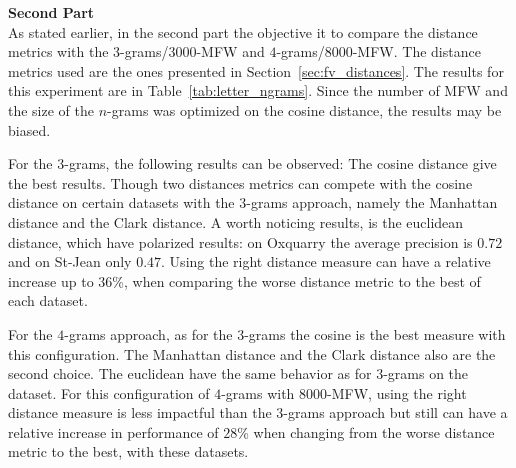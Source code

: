 \textbf{Second Part}\\
As stated earlier, in the second part the objective it to compare the distance metrics with the $3$-grams/$3000$-MFW and $4$-grams/$8000$-MFW.
The distance metrics used are the ones presented in Section~\ref{sec:fv_distances}.
The results for this experiment are in Table~\ref{tab:letter_ngrams}.
Since the number of MFW and the size of the $n$-grams was optimized on the cosine distance, the results may be biased.

For the $3$-grams, the following results can be observed:
The cosine distance give the best results.
Though two distances metrics can compete with the cosine distance on certain datasets with the $3$-grams approach, namely the Manhattan distance and the Clark distance.
A worth noticing results, is the euclidean distance, which have polarized results: on Oxquarry the average precision is $0.72$ and on St-Jean only $0.47$.
Using the right distance measure can have a relative increase up to $36$\%, when comparing the worse distance metric to the best of each dataset.

For the $4$-grams approach, as for the $3$-grams the cosine is the best measure with this configuration.
The Manhattan distance and the Clark distance also are the second choice.
The euclidean have the same behavior as for $3$-grams on the dataset.
For this configuration of $4$-grams with $8000$-MFW, using the right distance measure is less impactful than the $3$-grams approach but still can have a relative increase in  performance of $28$\% when changing from the worse distance metric to the best, with these datasets.

